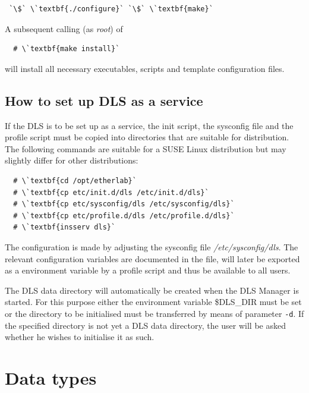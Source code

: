 \documentclass[a4paper,12pt,BCOR6mm,bibtotoc,idxtotoc]{scrbook}
\begin{document}
\begin{lstlisting} `\$` \`textbf{./configure}` `\$` \`textbf{make}` \end{lstlisting}

A subsequent calling (as \textit{root}) of

\begin{lstlisting} 
  # \`textbf{make install}` 
\end{lstlisting}

will install all necessary executables, scripts and template configuration files.

\section{How to set up DLS as a service}

If the DLS is to be set up as a service, the init script, the sysconfig file and the profile script must be copied into directories that are suitable for distribution. The following commands are suitable for a SUSE Linux distribution but may slightly differ for other distributions:

\begin{lstlisting} 
  # \`textbf{cd /opt/etherlab}` 
  # \`textbf{cp etc/init.d/dls /etc/init.d/dls}` 
  # \`textbf{cp etc/sysconfig/dls /etc/sysconfig/dls}` 
  # \`textbf{cp etc/profile.d/dls /etc/profile.d/dls}` 
  # \`textbf{insserv dls}` 
\end{lstlisting}

The configuration is made by adjusting the sysconfig file \textit{/etc/sysconfig/dls}. The relevant configuration variables are documented in the file, will later be exported as a environment variable by a profile script and thus be available to all users.

The DLS data directory will automatically be created when the DLS Manager is started. For this purpose either the environment variable \$DLS\_DIR must be set or the directory to be initialised must be transferred by means of parameter \texttt{-d}. If the specified directory is not yet a DLS data directory, the user will be asked whether he wishes to initialise it as such.


\chapter{Data types} \label{sec:apx_types}
\end{document}
